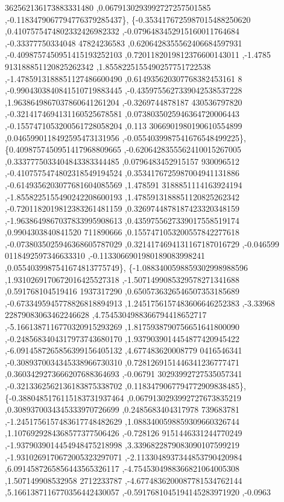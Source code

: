 \begin{DoxyCode}
      362562136173883331480 ,0.0679130293992727257501585 ,-0.1183479067794776379285437\},
\{-0.3534176725987015488250620 ,0.4107575474802332426982332 ,-0.0796483452915160011764684 ,-0.33377750334048
      47824236583 ,0.6206428355562406684597931 ,-0.4098757450951415193252103 ,0.7201182019812376600143011 ,-1.4785
      913188851120825262342 ,1.8558225155490257751722538 ,-1.4785913188851127486600490 ,0.614935620307768382453161
      8 ,-0.9904303840841510719883445 ,-0.4359755627339042538537228 ,1.9638649867037860641261204 ,-0.3269744878187
      430536797820 ,-0.3214174694131160525678581 ,0.0738035025946364720006443 ,-0.1557471053200561728058204 ,0.113
      3066901980190610554899 ,0.0465990118492595473131956 ,-0.0554039987541676548499225\},
\{0.4098757450951417968809665 ,-0.6206428355562410015267005 ,0.3337775033404843383344485 ,0.0796483452915157
      930096512 ,-0.4107575474802318549194524 ,0.3534176725987004941131886 ,-0.6149356203077681604085569 ,1.478591
      3188851114163924194 ,-1.8558225155490242208600193 ,1.4785913188851120825262342 ,-0.7201182019812383261481159
       ,0.3269744878187423320348159 ,-1.9638649867037833995908613 ,0.4359755627339017558519174 ,0.9904303840841520
      711890666 ,0.1557471053200557842277618 ,-0.0738035025946368605787029 ,0.3214174694131167187016729 ,-0.046599
      0118492597346633310 ,-0.1133066901980189083998241 ,0.0554039987541674813775749\},
\{-1.0883400598859302998988596 ,1.9310269170672016425527318 ,-1.5071499085329578271341688 ,0.591768104519416
      1937317290 ,0.6505736326546507353185689 ,-0.6733495945778826818894913 ,1.2451756157483606646252383 ,-3.33968
      22879083063462246628 ,4.7545304988366794418652717 ,-5.1661387116770320915293269 ,1.8175938790756651641800090
       ,-0.2485683404317973743680170 ,1.9379039014454877420945422 ,-6.0914587265856399156405132 ,4.677483620008779
      0416546341 ,-0.3089370034345338966730310 ,0.7281269151446341236777471 ,0.3603429273666207688364693 ,-0.06791
      30293992727535057341 ,-0.3213362562136183875338702 ,0.1183479067794772909838485\},
\{-0.3880485176115183731937464 ,0.0679130293992727673835219 ,0.3089370034345333970726699 ,0.2485683404317978
      739683781 ,-1.2451756157483617748482629 ,1.0883400598859309660326744 ,1.1076929284368577377506426 ,-0.728126
      9151446331244770249 ,-1.9379039014454948475218998 ,3.3396822879083090107599219 ,-1.9310269170672005323297071
       ,-2.1133048937344853790420984 ,6.0914587265856443565326117 ,-4.7545304988366821064005308 ,1.507149908532958
      2712233787 ,-4.6774836200087781534762144 ,5.1661387116770356442430057 ,-0.5917681045194145283971920 ,-0.0963

\end{DoxyCode}
